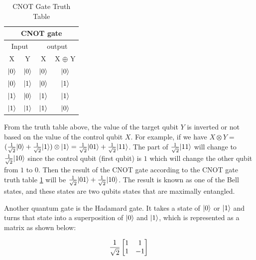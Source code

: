 \documentclass[12pt,a4paper]{article}
\DeclarePairedDelimiter\ket{\lvert}{\rangle}
\begin{document}
	\begin{table}[H]
		\centering
		\begin{tabular}{|c c c c|} 
			\hline
			\multicolumn{4}{|c|}{CNOT gate} \\ [0.5ex]
			\hline
			\multicolumn{2}{|c|}{Input} & \multicolumn{2}{c|}{output} \\ [0.5ex] 
			\hline
			\multicolumn{1}{|c|}{X} & \multicolumn{1}{|c|}{Y} & \multicolumn{1}{|c|}{X} & \multicolumn{1}{|c|}{X $\oplus$ Y} \\ [0.5ex] 
			\hline
			\multicolumn{1}{|c}{ $\ket{0}$} & \multicolumn{1}{|c|}{ $\ket{0}$} & \multicolumn{1}{|c|}{ $\ket{0}$} & \multicolumn{1}{c|}{ $\ket{0}$} \\ 
			\hline
			\multicolumn{1}{|c}{ $\ket{0}$} & \multicolumn{1}{|c|}{ $\ket{1}$} & \multicolumn{1}{|c|}{ $\ket{0}$} & \multicolumn{1}{c|}{$\ket{1}$} \\ 
			\hline
			\multicolumn{1}{|c}{$\ket{1}$} & \multicolumn{1}{|c|}{ $\ket{0}$} & \multicolumn{1}{|c|}{$\ket{1}$} & \multicolumn{1}{c|}{$\ket{1}$} \\ 
			\hline
			\multicolumn{1}{|c}{$\ket{1}$} & \multicolumn{1}{|c|}{$\ket{1}$} & \multicolumn{1}{|c|}{$\ket{1}$} & \multicolumn{1}{c|}{ $\ket{0}$} \\ 
			\hline
		\end{tabular}
		\caption{CNOT Gate Truth Table}
		\label{table:1}
	\end{table}
	
	From the truth table above, the value of the target qubit $Y$ is inverted or not based on the value of the control qubit $X$. For example, if we have $X \otimes Y =$ $ (\frac{1}{\sqrt2}\ket{0} + \frac{1}{\sqrt2}\ket{1}) \otimes \ket{1} =  \frac{1}{\sqrt2}\ket{01} + \frac{1}{\sqrt2}\ket{11}$.  The part of $\frac{1}{\sqrt2}\ket{11}$ will change to $\frac{1}{\sqrt2}\ket{10}$ since the control qubit (first qubit) is $1$ which will change the other qubit from $1$ to $0$. Then the result of the CNOT gate according to the CNOT gate truth table \ref{table:1} will be $ \frac{1}{\sqrt2}\ket{01} + \frac{1}{\sqrt2}\ket{10}$. The result is known as one of the Bell states, and these states are two qubits states that are maximally entangled.
	
	Another quantum gate is the Hadamard gate. It takes a state of $\ket{0}$ or $\ket{1}$ and turns that state into a superposition of $\ket{0}$ and $\ket{1}$, which is represented as a matrix as shown below:
	
	\begin{equation}
		\label{eqn:equation1}
		\frac{1}{\sqrt{2}} \begin{bmatrix*}
			1 & 1\\ 1 & -1
		\end{bmatrix*}\\
	\end{equation}
	
\end{document}
